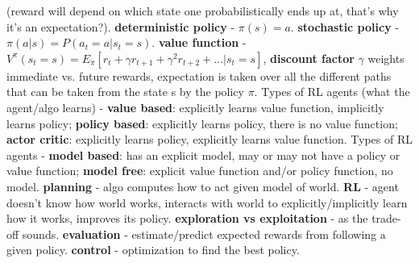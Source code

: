 \documentclass{article}
\begin{document}
\begin{itemize}
(reward will depend on which state one probabilistically ends up at, that's why it's an expectation?). \textbf{deterministic policy} - $\pi(s)=a$. \textbf{stochastic policy} - $\pi(a|s) = P(a_t=a | s_t=s)$. \textbf{value function} - $V^\pi(s_t=s) = E_\pi[r_t + \gamma r_{t+1} + \gamma^2 r_{t+2} + ... | s_t=s]$, \textbf{discount factor} $\gamma$ weights immediate vs. future rewards, expectation is taken over all the different paths that can be taken from the state s by the policy $\pi$. Types of RL agents (what the agent/algo learns) - \textbf{value based}: explicitly learns value function, implicitly learns policy; \textbf{policy based}: explicitly learns policy, there is no value function; \textbf{actor critic}: explicitly learns policy, explicitly learns value function. Types of RL agents - \textbf{model based}: has an explicit model, may or may not have a policy or value function; \textbf{model free}: explicit value function and/or policy function, no model. \textbf{planning} - algo computes how to act given model of world. \textbf{RL} - agent doesn't know how world works, interacts with world to explicitly/implicitly learn how it works, improves its policy. \textbf{exploration vs exploitation} - as the trade-off sounds. \textbf{evaluation} - estimate/predict expected rewards from following a given policy. \textbf{control} - optimization to find the best policy. 

\end{itemize}
\end{document}
